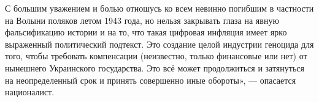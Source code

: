С большим уважением и болью отношусь ко всем невинно погибшим в частности на
Волыни поляков летом 1943 года, но нельзя закрывать глаза на явную
фальсификацию истории и на то, что такая цифровая инфляция имеет ярко
выраженный политический подтекст. Это создание целой индустрии геноцида для
того, чтобы требовать компенсации (неизвестно, только финансовые или нет) от
нынешнего Украинского государства. Это всё может продолжиться и затянуться на
неопределенный срок и принять совершенно иные обороты», --- опасается
националист.


